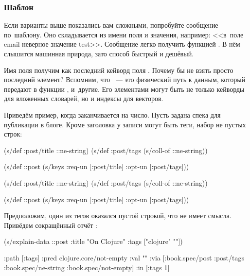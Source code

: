 \subsubsection*{Шаблон}


Если варианты выше показались вам сложными, попробуйте сообщение по~шаблону. Оно
складывается из имени поля и значения, например: <<в~поле email неверное
значение test>>. Сообщение легко получить функцией . В нём
слышится машинная природа, зато способ быстрый и дешёвый.

Имя поля получим как последний кейворд поля . Почему бы не взять
просто последний элемент? Вспомним, что ~--- это физический путь к данным,
который передают в функции ,  и~другие. Его
элементами могут быть не только кейворды для вложенных словарей, но и индексы
для векторов.

Приведём пример, когда  заканчивается на число. Пусть задана
спека  для публикации в блоге. Кроме заголовка у записи могут
быть теги, набор не пустых строк:

\ifnarrow


\begin{clojure}
(s/def :post/title ::ne-string)
(s/def :post/tags
  (s/coll-of ::ne-string))

(s/def ::post
  (s/keys :req-un [:post/title]
          :opt-un [:post/tags]))
\end{clojure}


\else


\begin{clojure}
(s/def :post/title ::ne-string)
(s/def :post/tags (s/coll-of ::ne-string))

(s/def ::post (s/keys :req-un [:post/title]
                      :opt-un [:post/tags]))
\end{clojure}


\fi

Предположим, один из тегов оказался пустой строкой, что не имеет
смысла. Привёдем сокращённый отчёт :

\ifnarrow


\begin{clojure}
(s/explain-data ::post
  {:title "On Clojure"
   :tags ["clojure" ""]})

{:path [:tags]
 :pred clojure.core/not-empty
 :val ""
 :via [:book.spec/post
       :post/tags
       :book.spec/ne-string
       :book.spec/not-empty]
 :in [:tags 1]}
\end{clojure}


